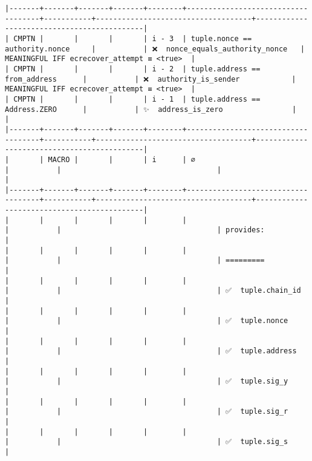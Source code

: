 \documentclass[varwidth=\maxdimen,margin=0.5cm,multi={verbatim}]{standalone}
\begin{document}
\begin{verbatim}
|-------+-------+-------+-------+--------+------------------------------------+-----------+------------------------------------+--------------------------------------------|
| CMPTN |       |       |       | i - 3  | tuple.nonce == authority.nonce     |           | ❌  nonce_equals_authority_nonce   | MEANINGFUL IFF ecrecover_attempt ≡ <true>  |
| CMPTN |       |       |       | i - 2  | tuple.address == from_address      |           | ❌  authority_is_sender            | MEANINGFUL IFF ecrecover_attempt ≡ <true>  |
| CMPTN |       |       |       | i - 1  | tuple.address == Address.ZERO      |           | ✨  address_is_zero                |                                            |
|-------+-------+-------+-------+--------+------------------------------------+-----------+------------------------------------+--------------------------------------------|
|       | MACRO |       |       | i      | ∅                                  |           |                                    |                                            |
|-------+-------+-------+-------+--------+------------------------------------+-----------+------------------------------------+--------------------------------------------|
|       |       |       |       |        |                                    |           |                                    | provides:                                  |
|       |       |       |       |        |                                    |           |                                    | =========                                  |
|       |       |       |       |        |                                    |           |                                    | ✅  tuple.chain_id                         |
|       |       |       |       |        |                                    |           |                                    | ✅  tuple.nonce                            |
|       |       |       |       |        |                                    |           |                                    | ✅  tuple.address                          |
|       |       |       |       |        |                                    |           |                                    | ✅  tuple.sig_y                            |
|       |       |       |       |        |                                    |           |                                    | ✅  tuple.sig_r                            |
|       |       |       |       |        |                                    |           |                                    | ✅  tuple.sig_s                            |

\end{verbatim}
\end{document}
